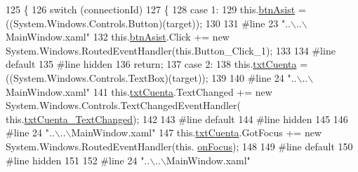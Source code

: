 \begin{DoxyCode}
125                                                                                                 \{
126             \textcolor{keywordflow}{switch} (connectionId)
127             \{
128             \textcolor{keywordflow}{case} 1:
129             this.\hyperlink{class_asistencias__wpf_1_1_main_window_a65c34d321ad5d831ae14e80205d153b8}{btnAsist} = ((System.Windows.Controls.Button)(target));
130             
131 \textcolor{preprocessor}{            #line 23 "..\(\backslash\)..\(\backslash\)MainWindow.xaml"}
132 \textcolor{preprocessor}{}            this.\hyperlink{class_asistencias__wpf_1_1_main_window_a65c34d321ad5d831ae14e80205d153b8}{btnAsist}.Click += \textcolor{keyword}{new} System.Windows.RoutedEventHandler(this.Button\_Click\_1);
133             
134 \textcolor{preprocessor}{            #line default}
135 \textcolor{preprocessor}{}\textcolor{preprocessor}{            #line hidden}
136 \textcolor{preprocessor}{}            \textcolor{keywordflow}{return};
137             \textcolor{keywordflow}{case} 2:
138             this.\hyperlink{class_asistencias__wpf_1_1_main_window_a52e76fc15be974c00138b13ab7e19b44}{txtCuenta} = ((System.Windows.Controls.TextBox)(target));
139             
140 \textcolor{preprocessor}{            #line 24 "..\(\backslash\)..\(\backslash\)MainWindow.xaml"}
141 \textcolor{preprocessor}{}            this.\hyperlink{class_asistencias__wpf_1_1_main_window_a52e76fc15be974c00138b13ab7e19b44}{txtCuenta}.TextChanged += \textcolor{keyword}{new} System.Windows.Controls.TextChangedEventHandler(
      this.\hyperlink{class_asistencias__wpf_1_1_main_window_af16b10485e73a8cc0c7cef9d26983798}{txtCuenta\_TextChanged});
142             
143 \textcolor{preprocessor}{            #line default}
144 \textcolor{preprocessor}{}\textcolor{preprocessor}{            #line hidden}
145 \textcolor{preprocessor}{}            
146 \textcolor{preprocessor}{            #line 24 "..\(\backslash\)..\(\backslash\)MainWindow.xaml"}
147 \textcolor{preprocessor}{}            this.\hyperlink{class_asistencias__wpf_1_1_main_window_a52e76fc15be974c00138b13ab7e19b44}{txtCuenta}.GotFocus += \textcolor{keyword}{new} System.Windows.RoutedEventHandler(this.
      \hyperlink{class_asistencias__wpf_1_1_main_window_acb5ec5ec33907eb146447f12fcd18d94}{onFocus});
148             
149 \textcolor{preprocessor}{            #line default}
150 \textcolor{preprocessor}{}\textcolor{preprocessor}{            #line hidden}
151 \textcolor{preprocessor}{}            
152 \textcolor{preprocessor}{            #line 24 "..\(\backslash\)..\(\backslash\)MainWindow.xaml"}

\end{DoxyCode}
